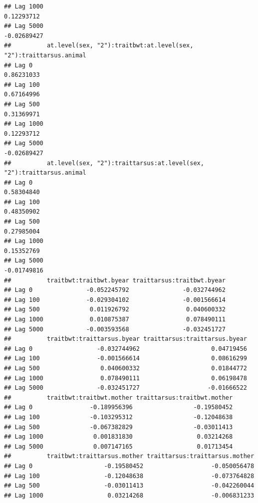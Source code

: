 \documentclass[
  12pt,
]{book}
\begin{document}
\begin{verbatim}
## Lag 1000                                                        0.12293712
## Lag 5000                                                       -0.02689427
##          at.level(sex, "2"):traitbwt:at.level(sex, "2"):traittarsus.animal
## Lag 0                                                           0.86231033
## Lag 100                                                         0.67164996
## Lag 500                                                         0.31369971
## Lag 1000                                                        0.12293712
## Lag 5000                                                       -0.02689427
##          at.level(sex, "2"):traittarsus:at.level(sex, "2"):traittarsus.animal
## Lag 0                                                              0.58304840
## Lag 100                                                            0.48350902
## Lag 500                                                            0.27985004
## Lag 1000                                                           0.15352769
## Lag 5000                                                          -0.01749816
##          traitbwt:traitbwt.byear traittarsus:traitbwt.byear
## Lag 0               -0.052245792               -0.032744962
## Lag 100             -0.029304102               -0.001566614
## Lag 500              0.011926792                0.040600332
## Lag 1000             0.010875387                0.078490111
## Lag 5000            -0.003593568               -0.032451727
##          traitbwt:traittarsus.byear traittarsus:traittarsus.byear
## Lag 0                  -0.032744962                    0.04719456
## Lag 100                -0.001566614                    0.08616299
## Lag 500                 0.040600332                    0.01844772
## Lag 1000                0.078490111                    0.06198478
## Lag 5000               -0.032451727                   -0.01666522
##          traitbwt:traitbwt.mother traittarsus:traitbwt.mother
## Lag 0                -0.189956396                 -0.19580452
## Lag 100              -0.103295312                 -0.12048638
## Lag 500              -0.067382829                 -0.03011413
## Lag 1000              0.001831830                  0.03214268
## Lag 5000              0.007147165                  0.01713454
##          traitbwt:traittarsus.mother traittarsus:traittarsus.mother
## Lag 0                    -0.19580452                   -0.050056478
## Lag 100                  -0.12048638                   -0.073764828
## Lag 500                  -0.03011413                   -0.042260044
## Lag 1000                  0.03214268                   -0.006831233

\end{verbatim}
\end{document}
